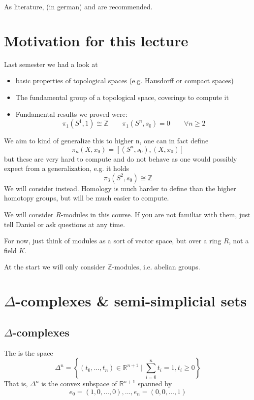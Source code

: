 As literature, \cite{algebraische-topologie-lueck} (in german) and \cite{algebraic-topology-hatcher} are recommended.

\setcounter{section}{-1}
\section{Motivation for this lecture}

Last semester we had a look at
\begin{itemize}
    \item basic properties of topological spaces (e.g. Hausdorff or compact spaces)
    \item The fundamental group of a topological space, coverings to compute it
    \item Fundamental results we proved were:
        \[
            \pi_1(S^1,1)\cong \mathbb{Z} \qquad \pi_1(S^n, s_0) = 0 \qquad \forall n\geq 2
        \] 
\end{itemize}

We aim to kind of generalize this to higher n, one can in fact define
\[
    \pi_n(X,x_0) = [(S^n,s_0), (X,x_0)]
\] 
but these are very hard to compute and do not behave as one would possibly expect from a generalization, e.g. it holds
\[
    \pi_3(S^2,s_0) \cong \mathbb{Z}
\] 
We will consider  instead. Homology is much harder to define than the higher homotopy groups, but will be much easier to compute.

\begin{warning}
    We will consider $R$-modules in this course. If you are not familiar with them, just tell Daniel or ask questions at any time.
\end{warning}

For now, just think of modules as a sort of vector space, but over a ring $R$, not a field  $K$.

At the start we will only consider $\mathbb{Z}$-modules, i.e. abelian groups.


\section{$\Delta$-complexes \& semi-simplicial sets}
\subsection{$\Delta$-complexes}

\begin{definition}[simplex]\label{def:simplex}
    The  is the space
    \[
        \Delta^n = \left \{(t_0,\ldots,t_n)\in \mathbb{R}^{n+1} \mid  \sum_{i=0}^n t_i = 1, t_i \geq  0\right\} 
    \]
    That is, $\Delta^n$ is the convex subspace of  $\mathbb{R}^{n+1}$ spanned by
    \[
        e_0 =(1,0,\ldots,0), \ldots, e_n = (0,0,\ldots,1)
    \] 
\end{definition}


